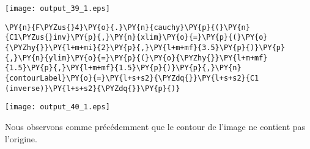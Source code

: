 \begin{center}
    \texttt{[image: output\_39\_1.eps]}
\end{center}
\begin{tcolorbox}[breakable, size=fbox, boxrule=1pt, pad at break*=1mm,colback=cellbackground, colframe=cellborder]
\begin{Verbatim}[commandchars=\\\{\}]
\PY{n}{F\PYZus{}4}\PY{o}{.}\PY{n}{cauchy}\PY{p}{(}\PY{n}{C1\PYZus{}inv}\PY{p}{,}\PY{n}{xlim}\PY{o}{=}\PY{p}{(}\PY{o}{\PYZhy{}}\PY{l+m+mi}{2}\PY{p}{,}\PY{l+m+mf}{3.5}\PY{p}{)}\PY{p}{,}\PY{n}{ylim}\PY{o}{=}\PY{p}{(}\PY{o}{\PYZhy{}}\PY{l+m+mf}{1.5}\PY{p}{,}\PY{l+m+mf}{1.5}\PY{p}{)}\PY{p}{,}\PY{n}{contourLabel}\PY{o}{=}\PY{l+s+s2}{\PYZdq{}}\PY{l+s+s2}{C1 (inverse)}\PY{l+s+s2}{\PYZdq{}}\PY{p}{)}
\end{Verbatim}
\end{tcolorbox}
\begin{center}
    \texttt{[image: output\_40\_1.eps]}
\end{center}
Nous observons comme précédemment que le contour de l'image ne contient pas l'origine. 

